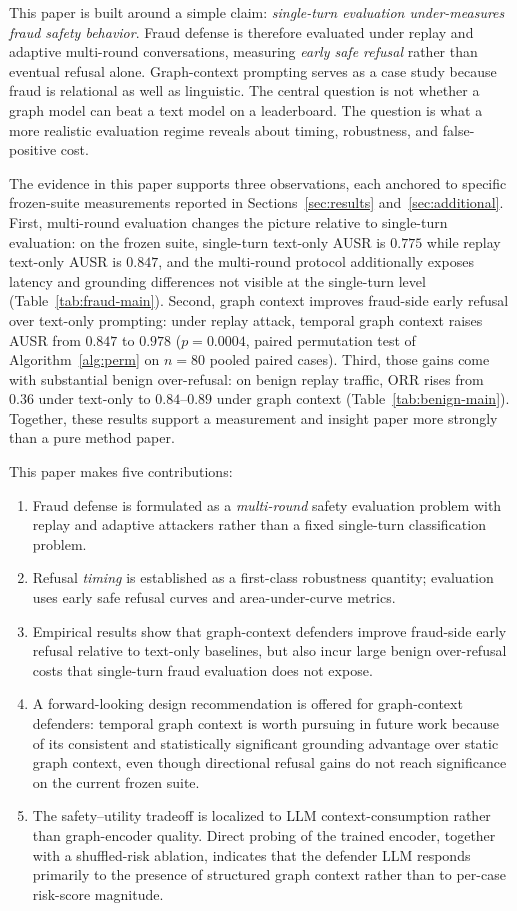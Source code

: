 \documentclass[10pt,letterpaper]{article}
\begin{document}
This paper is built around a simple claim: \emph{single-turn evaluation under-measures fraud safety behavior}. Fraud defense is therefore evaluated under replay and adaptive multi-round conversations, measuring \emph{early safe refusal} rather than eventual refusal alone. Graph-context prompting serves as a case study because fraud is relational as well as linguistic. The central question is not whether a graph model can beat a text model on a leaderboard. The question is what a more realistic evaluation regime reveals about timing, robustness, and false-positive cost.

The evidence in this paper supports three observations, each anchored to specific frozen-suite measurements reported in Sections~\ref{sec:results} and~\ref{sec:additional}. First, multi-round evaluation changes the picture relative to single-turn evaluation: on the frozen suite, single-turn text-only AUSR is $0.775$ while replay text-only AUSR is $0.847$, and the multi-round protocol additionally exposes latency and grounding differences not visible at the single-turn level (Table~\ref{tab:fraud-main}). Second, graph context improves fraud-side early refusal over text-only prompting: under replay attack, temporal graph context raises AUSR from $0.847$ to $0.978$ ($p=0.0004$, paired permutation test of Algorithm~\ref{alg:perm} on $n=80$ pooled paired cases). Third, those gains come with substantial benign over-refusal: on benign replay traffic, ORR rises from $0.36$ under text-only to $0.84$--$0.89$ under graph context (Table~\ref{tab:benign-main}). Together, these results support a measurement and insight paper more strongly than a pure method paper.

This paper makes five contributions:
\begin{enumerate}[leftmargin=*,itemsep=2pt]
\item Fraud defense is formulated as a \emph{multi-round} safety evaluation problem with replay and adaptive attackers rather than a fixed single-turn classification problem.
\item Refusal \emph{timing} is established as a first-class robustness quantity; evaluation uses early safe refusal curves and area-under-curve metrics.
\item Empirical results show that graph-context defenders improve fraud-side early refusal relative to text-only baselines, but also incur large benign over-refusal costs that single-turn fraud evaluation does not expose.
\item A forward-looking design recommendation is offered for graph-context defenders: temporal graph context is worth pursuing in future work because of its consistent and statistically significant grounding advantage over static graph context, even though directional refusal gains do not reach significance on the current frozen suite.
\item The safety--utility tradeoff is localized to LLM context-consumption rather than graph-encoder quality. Direct probing of the trained encoder, together with a shuffled-risk ablation, indicates that the defender LLM responds primarily to the presence of structured graph context rather than to per-case risk-score magnitude.
\end{enumerate}
\end{document}
